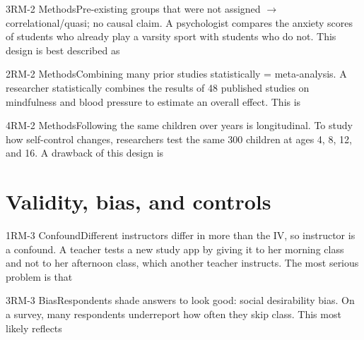 \documentclass[11pt]{article}
\begin{document}
\begin{q}{3}{RM-2 Methods}{Pre-existing groups that were not assigned \(\rightarrow\) correlational/quasi; no causal claim.}
A psychologist compares the anxiety scores of students who already play a varsity sport with students who do not. This design is best described as
\end{q}

\begin{q}{2}{RM-2 Methods}{Combining many prior studies statistically = meta-analysis.}
A researcher statistically combines the results of 48 published studies on mindfulness and blood pressure to estimate an overall effect. This is
\end{q}

\begin{q}{4}{RM-2 Methods}{Following the same children over years is longitudinal.}
To study how self-control changes, researchers test the same 300 children at ages 4, 8, 12, and 16. A drawback of this design is
\end{q}

\section{Validity, bias, and controls}

\begin{q}{1}{RM-3 Confound}{Different instructors differ in more than the IV, so instructor is a confound.}
A teacher tests a new study app by giving it to her morning class and not to her afternoon class, which another teacher instructs. The most serious problem is that
\end{q}

\begin{q}{3}{RM-3 Bias}{Respondents shade answers to look good: social desirability bias.}
On a survey, many respondents underreport how often they skip class. This most likely reflects
\end{q}
\end{document}
